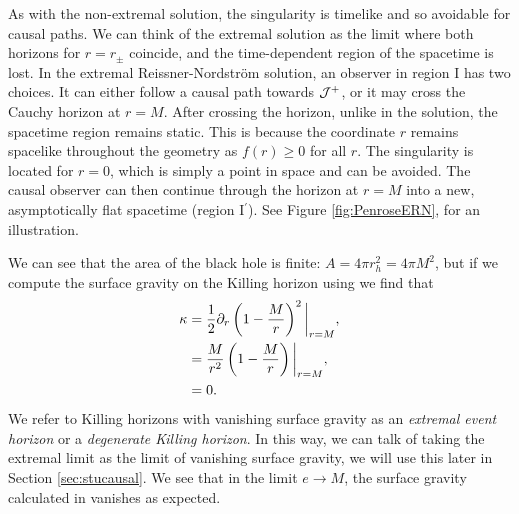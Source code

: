 As with the non-extremal solution, the singularity is timelike and so avoidable for causal paths. We can think of the extremal solution as the limit where both horizons for $r = r_\pm$ coincide, and the time-dependent region of the spacetime is lost. In the extremal Reissner-Nordstr\"om solution, an observer in region I has two choices. It can either follow a causal path towards ${\cal J}^+$, or it may cross the Cauchy horizon at $r = M$. After crossing the horizon, unlike in the \sch solution, the spacetime region remains static. This is because the coordinate $r$ remains spacelike throughout the geometry as $f(r) \geq 0$ for all $r$. The singularity is located for $r = 0$, which is simply a point in space and can be avoided. The causal observer can then continue through the horizon at $r = M$ into a new, asymptotically flat spacetime (region I$^\prime$). See Figure \ref{fig:PenroseERN}, for an illustration.

We can see that the area of the black hole is finite: $A = 4\pi r_h^2 = 4\pi M^2$, but if we compute the surface gravity on the Killing horizon using  we find that
\begin{equation*}
\begin{aligned}
	\kappa &= \frac{1}{2} \partial_r \left( 1 - \frac{M}{r}\right)^2 \bigg|_{r = M}, \\
	&= \frac{M}{r^2} \left( 1 - \frac{M}{r}\right) \bigg|_{r = M},\\
	&= 0.
\end{aligned}
\end{equation*}
We refer to Killing horizons with vanishing surface gravity as an \emph{extremal event horizon} or a \emph{degenerate Killing horizon}. In this way, we can talk of taking the extremal limit as the limit of vanishing surface gravity, we will use this later in Section \ref{sec:stucausal}. We see that in the limit $e \to M$, the surface gravity calculated in  vanishes as expected.

